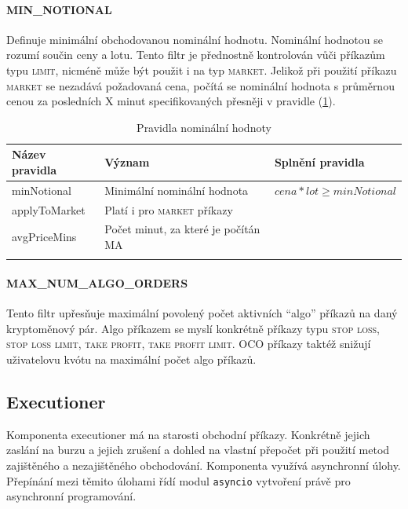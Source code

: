 \paragraph*{MIN\_NOTIONAL}
Definuje minimální obchodovanou nominální hodnotu. Nominální hodnotou se rozumí součin ceny a lotu. Tento filtr je přednostně kontrolován vůči příkazům typu \textsc{limit}, nicméně
může být použit i na typ \textsc{market}. Jelikož při použití příkazu \textsc{market} se nezadává požadovaná cena, počítá se nominální hodnota s průměrnou cenou za posledních X minut
specifikovaných přesněji v pravidle (\ref{tab:binance:notional_filter}).
\begin{center}
    \begin{longtable}[h]{|l|l|l|}
        \hline
        Název pravidla & Význam                              & Splnění pravidla                \\
        \hline
        minNotional    & Minimální nominální hodnota         & $ cena * lot \geq minNotional $ \\
        \hline
        applyToMarket  & Platí i pro \textsc{market} příkazy &                                 \\
        \hline
        avgPriceMins   & Počet minut, za které je počítán MA &                                 \\
        \hline
        \caption{Pravidla nominální hodnoty}
        \label{tab:binance:notional_filter}
    \end{longtable}
\end{center}

\paragraph*{MAX\_NUM\_ALGO\_ORDERS}
Tento filtr upřesňuje maximální povolený počet aktivních \enquote{algo} příkazů na daný kryptoměnový pár. Algo příkazem se myslí konkrétně příkazy typu
\textsc{stop loss, stop loss limit, take profit, take profit limit}. OCO příkazy taktéž snižují uživatelovu kvótu na maximální počet algo příkazů.

\subsection{Executioner}
Komponenta executioner má na starosti obchodní příkazy. Konkrétně jejich zaslání na burzu a jejich zrušení a dohled na vlastní přepočet při použití metod zajištěného a nezajištěného obchodování. Komponenta
využívá asynchronní úlohy. Přepínání mezi těmito úlohami řídí modul \verb|asyncio| vytvoření právě pro asynchronní programování.

